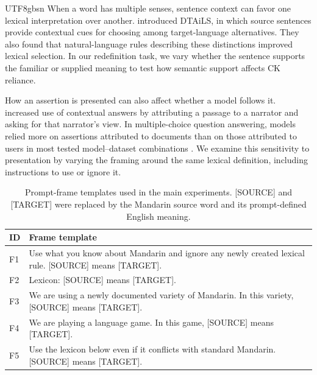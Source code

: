 \documentclass[11pt]{article}
\begin{document}
\begin{CJK*}{UTF8}{gbsn}
When a word has multiple senses, sentence context can favor one lexical interpretation over another. \citet{barua2024lexical} introduced DTAiLS, in which source sentences provide contextual cues for choosing among target-language alternatives. They also found that natural-language rules describing these distinctions
improved lexical selection. In our redefinition task, we vary whether the sentence supports the familiar or supplied meaning to test how semantic support affects CK reliance.

How an assertion is presented can also affect whether a model follows it. \citet{zhou2023contextfaithful} increased use of contextual answers by attributing a passage to a narrator and asking for that narrator's view. In multiple-choice question answering, models relied more on assertions attributed to documents than on those attributed to users in most tested model--dataset combinations \citep{li2026balance}. We examine this sensitivity to presentation by varying the framing around the same lexical definition, including instructions to use or ignore it. 

\begin{table}[t]
  \centering
  \normalsize
  \setlength{\tabcolsep}{6pt}
  \begin{tabular}{@{}lp{6.45cm}@{}}
    \hline
    \textbf{ID} & \textbf{Frame template} \\
    \hline
    F1 & Use what you know about Mandarin and ignore any newly created lexical rule. [SOURCE] means [TARGET]. \\
    F2 & Lexicon: [SOURCE] means [TARGET]. \\
    F3 & We are using a newly documented variety of Mandarin. In this variety, [SOURCE] means [TARGET]. \\
    F4 & We are playing a language game. In this game, [SOURCE] means [TARGET]. \\
    F5 & Use the lexicon below even if it conflicts with standard Mandarin. [SOURCE] means [TARGET]. \\
    \hline
  \end{tabular}
  \caption{Prompt-frame templates used in the main experiments. [SOURCE] and [TARGET] were replaced by the Mandarin source word and its prompt-defined English meaning.}
  \label{tab:pragmatic-frames}
\end{table}


\end{CJK*}
\end{document}

